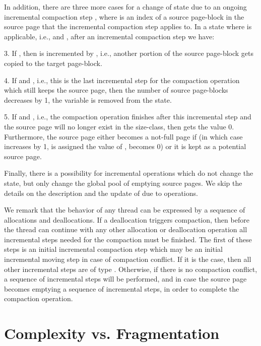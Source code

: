 \documentclass{amsart}
\begin{document}
In addition, there are three more cases for a change of state due to an ongoing incremental compaction step ,
where  is an index of a source page-block in the source page that the incremental compaction
step applies to. In a state  where 
is applicable, i.e.,  and , after an incremental compaction step  we have:

\begin{list}{}{\leftmargin=1.2em}
\item[3.] If , then  is incremented by , i.e., another portion of the source page-block gets
copied to the target page-block.
\item[4.] If  and , i.e., this is the last incremental step for the compaction operation
which still keeps the source page, then the
number of source page-blocks  decreases by 1, the variable  is removed from the state.
\item[5.] If  and , i.e., the compaction operation finishes after this incremental step
and the source page will no longer exist in the size-class, then
 gets the value 0. Furthermore, the source
page either becomes a not-full page if  (in which case  increases by 1,  is assigned the value of ,
 becomes 0) or it is kept as a potential source page.
\end{list}

Finally, there is a possibility for incremental operations  which
do not change the state, but only change the global pool  of
emptying source pages. We skip the details on the description and the
update of  due to  operations.



We remark that the behavior of any thread can be expressed by a
sequence of allocations and deallocations.  If a deallocation triggers
compaction, then before the thread can continue with any other
allocation or deallocation operation all incremental steps needed for
the compaction must be finished. The first of these steps is an
initial incremental compaction step  which may be an initial
incremental moving step in case of compaction conflict. If it is the
case, then all other incremental steps are of type . Otherwise,
if there is no compaction conflict, a sequence of  incremental
steps will be performed, and in case the source page becomes emptying
a sequence of  incremental steps, in order to complete the
compaction operation.

\section{Complexity vs. Fragmentation}
\label{sec:complexity}
\end{document}
